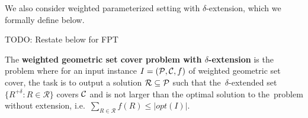 We also consider weighted parameterized setting with $\delta$-extension,
which we formally define below.

TODO: Restate below for FPT
\begin{defi}
The \textbf{weighted geometric set cover problem
with $\delta$-extension} is the problem where for an input instance
$I=(\mathcal{P}, \mathcal{C}, f)$ of weighted geometric set cover,
the task is to output a solution $\mathcal{R} \subseteq \mathcal{P}$
such that the~$\delta$-extended set
$\{ R^{+\delta} :  R \in \mathcal{R} \}$ covers $\mathcal{C}$
and is not larger than the optimal solution to the~problem without
extension, i.e.~$\sum_{R \in \mathcal{R}} f(R) \le |opt(I)|$.
\end{defi}

